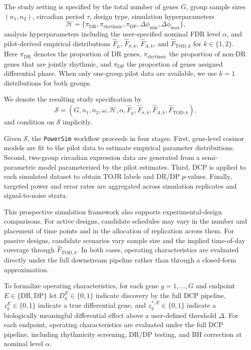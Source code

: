\documentclass{article}
\newcommand{\software}[1]{\texttt{#1}}
\begin{document}
The study setting is specified by the total number of genes $G$, group sample
sizes $(n_1,n_2)$, circadian period $\tau$, design type, simulation
hyperparameters
\[
\mathcal{H}
=
\{\pi_{\mathrm{DR}},\pi_{\mathrm{rhythmic}},\pi_{\mathrm{DP}},
\Delta\phi_{\min},\Delta\phi_{\max}\},
\]
analysis hyperparameters including the user-specified nominal FDR level
$\alpha$, and pilot-derived empirical distributions $\hat{F}_\mu$,
$\hat{F}_{\sigma,k}$, $\hat{F}_{A,k}$, and
$\hat{F}_{\mathrm{TOD},k}$ for $k\in\{1,2\}$.
Here $\pi_{\mathrm{DR}}$ denotes the proportion of DR genes,
$\pi_{\mathrm{rhythmic}}$ the proportion of non-DR genes that are jointly
rhythmic, and $\pi_{\mathrm{DP}}$ the proportion of genes assigned
differential phase. When only one-group pilot data are available, we use
$k=1$ distributions for both groups.

We denote the resulting study specification by
\[
\mathcal{S}
=
(G,n_1,n_2,\omega,\mathcal{H},\alpha,\hat{F}_\mu,
\hat{F}_{\sigma,k},\hat{F}_{A,k},\hat{F}_{\mathrm{TOD},k}),
\]
and condition on $\mathcal{S}$ implicitly.

Given $\mathcal{S}$, the \software{PowerSim} workflow proceeds in four stages.
First, gene-level cosinor models are fit to the pilot data to estimate
empirical parameter distributions. Second, two-group circadian expression data
are generated from a semi-parametric model parameterized by the pilot
estimates. Third, DCP is applied to each simulated dataset to obtain TOJR
labels and DR/DP $p$-values. Finally, targeted power and error rates are
aggregated across simulation replicates and signal-to-noise strata.

This prospective simulation framework also supports experimental-design
comparisons. For active designs, candidate schedules may vary in the number and
placement of time points and in the allocation of replication across them. For
passive designs, candidate scenarios vary sample size and the implied
time-of-day coverage through $\hat{F}_{\mathrm{TOD},k}$. In both cases,
operating characteristics are evaluated directly under the full downstream
pipeline rather than through a closed-form approximation.

To formalize operating characteristics, for each gene $g=1,\ldots,G$ and
endpoint $E\in\{\mathrm{DR},\mathrm{DP}\}$ let $D_g^E\in\{0,1\}$ indicate
discovery by the full DCP pipeline, $z_g^E\in\{0,1\}$ indicate a true
differential gene, and $z_g^{*,E}\in\{0,1\}$ indicate a biologically
meaningful differential effect above a user-defined threshold $\Delta$.
For each endpoint, operating characteristics are evaluated under the full DCP
pipeline, including rhythmicity screening, DR/DP testing, and BH correction at
nominal level $\alpha$.
\end{document}
